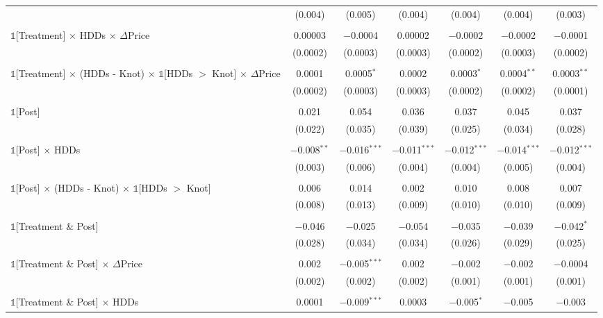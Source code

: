 \begin{table}[!htbp]
\begin{longtable}{@{\extracolsep{15pt}}lcccccc}
  & (0.004) & (0.005) & (0.004) & (0.004) & (0.004) & (0.003) \\ 
  & & & & & & \\ 
 $\mathbb{1}$[Treatment] $\times$ HDDs $\times$ $\Delta$Price & 0.00003 & $-$0.0004 & 0.00002 & $-$0.0002 & $-$0.0002 & $-$0.0001 \\ 
  & (0.0002) & (0.0003) & (0.0003) & (0.0002) & (0.0003) & (0.0002) \\ 
  & & & & & & \\ 
 $\mathbb{1}$[Treatment] $\times$ (HDDs - Knot) $\times$ $\mathbb{1}$[HDDs $>$ Knot] $\times$ $\Delta$Price & 0.0001 & 0.0005$^{*}$ & 0.0002 & 0.0003$^{*}$ & 0.0004$^{**}$ & 0.0003$^{**}$ \\ 
  & (0.0002) & (0.0003) & (0.0003) & (0.0002) & (0.0002) & (0.0001) \\ 
  & & & & & & \\ 
 $\mathbb{1}$[Post] & 0.021 & 0.054 & 0.036 & 0.037 & 0.045 & 0.037 \\ 
  & (0.022) & (0.035) & (0.039) & (0.025) & (0.034) & (0.028) \\ 
  & & & & & & \\ 
 $\mathbb{1}$[Post] $\times$ HDDs & $-$0.008$^{**}$ & $-$0.016$^{***}$ & $-$0.011$^{***}$ & $-$0.012$^{***}$ & $-$0.014$^{***}$ & $-$0.012$^{***}$ \\ 
  & (0.003) & (0.006) & (0.004) & (0.004) & (0.005) & (0.004) \\ 
  & & & & & & \\ 
 $\mathbb{1}$[Post] $\times$ (HDDs - Knot) $\times$ $\mathbb{1}$[HDDs $>$ Knot] & 0.006 & 0.014 & 0.002 & 0.010 & 0.008 & 0.007 \\ 
  & (0.008) & (0.013) & (0.009) & (0.010) & (0.010) & (0.009) \\ 
  & & & & & & \\ 
 $\mathbb{1}$[Treatment \& Post] & $-$0.046 & $-$0.025 & $-$0.054 & $-$0.035 & $-$0.039 & $-$0.042$^{*}$ \\ 
  & (0.028) & (0.034) & (0.034) & (0.026) & (0.029) & (0.025) \\ 
  & & & & & & \\ 
 $\mathbb{1}$[Treatment \& Post] $\times$ $\Delta$Price & 0.002 & $-$0.005$^{***}$ & 0.002 & $-$0.002 & $-$0.002 & $-$0.0004 \\ 
  & (0.002) & (0.002) & (0.002) & (0.001) & (0.001) & (0.001) \\ 
  & & & & & & \\ 
 $\mathbb{1}$[Treatment \& Post] $\times$ HDDs & 0.0001 & $-$0.009$^{***}$ & 0.0003 & $-$0.005$^{*}$ & $-$0.005 & $-$0.003 \\ 

\end{longtable}
\end{table}

